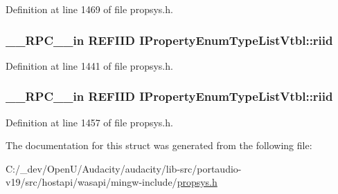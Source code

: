 Definition at line 1469 of file propsys.\+h.

\subsubsection[{\texorpdfstring{riid}{riid}}]{ {\bf \+\_\+\+\_\+\+R\+P\+C\+\_\+\+\_\+in} {\bf R\+E\+F\+I\+ID} I\+Property\+Enum\+Type\+List\+Vtbl\+::riid}\hypertarget{struct_i_property_enum_type_list_vtbl_a9502e4c8a151042f7a08a6179a2477db}{}\label{struct_i_property_enum_type_list_vtbl_a9502e4c8a151042f7a08a6179a2477db}


Definition at line 1441 of file propsys.\+h.

\subsubsection[{\texorpdfstring{riid}{riid}}]{ {\bf \+\_\+\+\_\+\+R\+P\+C\+\_\+\+\_\+in} {\bf R\+E\+F\+I\+ID} I\+Property\+Enum\+Type\+List\+Vtbl\+::riid}\hypertarget{struct_i_property_enum_type_list_vtbl_a9502e4c8a151042f7a08a6179a2477db}{}\label{struct_i_property_enum_type_list_vtbl_a9502e4c8a151042f7a08a6179a2477db}


Definition at line 1457 of file propsys.\+h.



The documentation for this struct was generated from the following file\+:\begin{DoxyCompactItemize}
\item 
C\+:/\+\_\+dev/\+Open\+U/\+Audacity/audacity/lib-\/src/portaudio-\/v19/src/hostapi/wasapi/mingw-\/include/\hyperlink{propsys_8h}{propsys.\+h}\end{DoxyCompactItemize}
